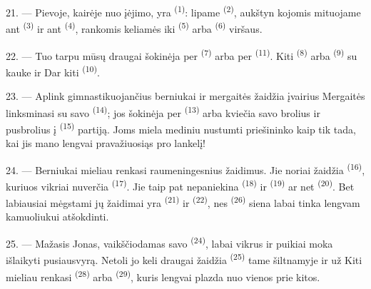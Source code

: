 21. --- Pievoje, kairėje nuo įėjimo, yra 
\textsuperscript{(1)}: lipame  \textsuperscript{(2)}, aukštyn
kojomis mituojame ant  \textsuperscript{(3)} ir ant 
\textsuperscript{(4)}, rankomis keliamės iki 
\textsuperscript{(5)} arba  \textsuperscript{(6)} viršaus.

22. --- Tuo tarpu mūsų draugai šokinėja per 
\textsuperscript{(7)} arba per  \textsuperscript{(11)}. Kiti
 \textsuperscript{(8)} arba 
\textsuperscript{(9)} su kauke ir  Dar kiti  \textsuperscript{(10)}.

\VUsaut{4.6mm}
\VUsaut{3.0mm}

23. --- Aplink gimnastikuojančius berniukai ir mergaitės žaidžia įvairius
 Mergaitės linksminasi su savo 
\textsuperscript{(14)}; jos šokinėja per  \textsuperscript{(13)} arba
kviečia savo brolius ir pusbrolius į  \textsuperscript{(15)} partiją.
Joms miela mediniu  nustumti priešininko  kaip tik
tada, kai jis mano lengvai pravažiuosiąs pro lankelį!

24. --- Berniukai mieliau renkasi raumeningesnius žaidimus. Jie noriai žaidžia
 \textsuperscript{(16)}, kuriuos vikriai nuverčia 
\textsuperscript{(17)}. Jie taip pat nepaniekina 
\textsuperscript{(18)} ir  \textsuperscript{(19)} ar net
 \textsuperscript{(20)}. Bet labiausiai mėgstami jų žaidimai
yra  \textsuperscript{(21)} ir 
\textsuperscript{(22)}, nes  \textsuperscript{(26)} siena labai
tinka lengvam kamuoliukui atšokdinti.

25. --- Mažasis Jonas, vaikščiodamas savo  \textsuperscript{(24)},
labai vikrus ir puikiai moka išlaikyti pusiausvyrą. Netoli jo keli draugai žaidžia
 \textsuperscript{(25)} tame šiltnamyje ir už 
Kiti mieliau renkasi  \textsuperscript{(28)} arba
 \textsuperscript{(29)}, kuris lengvai plazda nuo vienos
 prie kitos.

